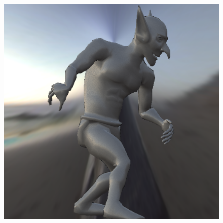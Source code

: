 \begin{figure}[H]
\endminipage\hfill
{}%
  \includegraphics[width=\linewidth]{./Imagens/brdfs/ashikhmin-shirley-close-to-original-goblin.png}
\endminipage
\end{figure}

